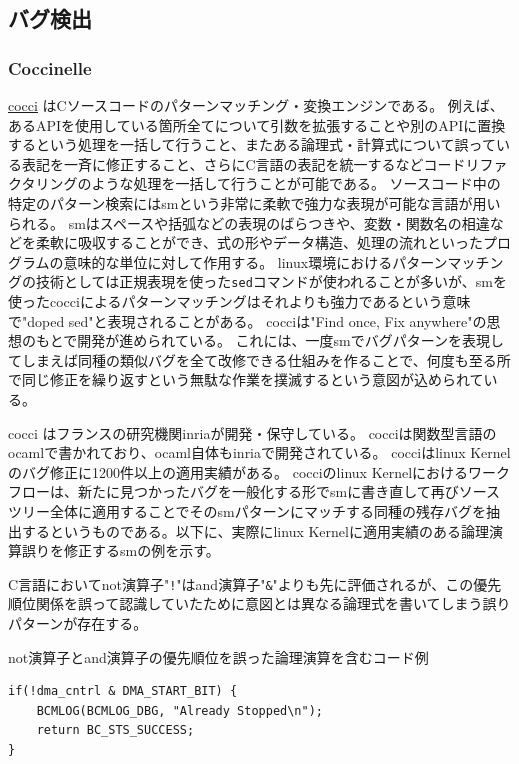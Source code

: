 \subsection{バグ検出}
\subsubsection{Coccinelle}
\label{cocci}
\href{http://coccinelle.lip6.fr/}{\acrshort{cocci}} \cite{cocci}はCソースコードのパターンマッチング・変換エンジンである。
例えば、あるAPIを使用している箇所全てについて引数を拡張することや別のAPIに置換するという処理を一括して行うこと、またある論理式・計算式について誤っている表記を一斉に修正すること、さらにC言語の表記を統一するなどコードリファクタリングのような処理を一括して行うことが可能である。
ソースコード中の特定のパターン検索には\acrshort{sm}という非常に柔軟で強力な表現が可能な言語が用いられる。
\acrshort{sm}はスペースや括弧などの表現のばらつきや、変数・関数名の相違などを柔軟に吸収することができ、式の形やデータ構造、処理の流れといったプログラムの意味的な単位に対して作用する。
\acrshort{linux}環境におけるパターンマッチングの技術としては正規表現を使った\verb|sed|コマンドが使われることが多いが、\acrshort{sm}を使った\acrshort{cocci}によるパターンマッチングはそれよりも強力であるという意味で"doped sed"と表現されることがある。
\acrshort{cocci}は"Find once, Fix anywhere"の思想のもとで開発が進められている。
これには、一度\acrshort{sm}でバグパターンを表現してしまえば同種の類似バグを全て改修できる仕組みを作ることで、何度も至る所で同じ修正を繰り返すという無駄な作業を撲滅するという意図が込められている。
\par
\acrshort{cocci} はフランスの研究機関\acrshort{inria}が開発・保守している。
\acrshort{cocci}は関数型言語の\acrshort{ocaml}で書かれており、\acrshort{ocaml}自体も\acrshort{inria}で開発されている。
\acrshort{cocci}は\acrshort{linux} Kernelのバグ修正に1200件以上の適用実績がある。
\acrshort{cocci}の\acrshort{linux} Kernelにおけるワークフローは、新たに見つかったバグを一般化する形で\acrshort{sm}に書き直して再びソースツリー全体に適用することでその\acrshort{sm}パターンにマッチする同種の残存バグを抽出するというものである。以下に、実際に\acrshort{linux} Kernelに適用実績のある論理演算誤りを修正する\acrshort{sm}の例を示す。
\par
C言語においてnot演算子"\verb|!|"はand演算子"\verb|&|"よりも先に評価されるが、この優先順位関係を誤って認識していたために意図とは異なる論理式を書いてしまう誤りパターンが存在する。
\begin{itembox}[l]{not演算子とand演算子の優先順位を誤った論理演算を含むコード例}
\begin{verbatim}
if(!dma_cntrl & DMA_START_BIT) {
    BCMLOG(BCMLOG_DBG, "Already Stopped\n");
    return BC_STS_SUCCESS;
}
\end{verbatim}
\end{itembox}
